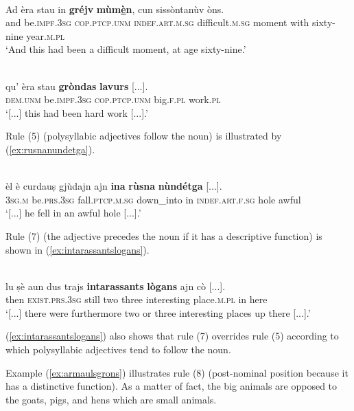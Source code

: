 \ea
\label{ex:grejvmumen}
\\
\gll    Ad èra stau in \textbf{gréjv} \textbf{mùm\underline{è}n}, cun sissòntanùv òns.\\
and be.\textsc{impf.3sg} \textsc{cop.ptcp.unm} \textsc{indef.art.m.sg} difficult.\textsc{m.sg} moment with sixty-nine year.\textsc{m.pl} \\
\glt `And this had been a difficult moment, at age sixty-nine.'
\z 

\ea
\label{ex:grondaslavurs}
\\
\gll [...] qu’ èra stau \textbf{gròndas} \textbf{lavurs} [...].\\
{} \textsc{dem.unm} be.\textsc{impf.3sg} \textsc{cop.ptcp.unm} big.\textsc{f.pl} work.\textsc{pl}\\
\glt `[...] this had been hard work [...].'
\z

Rule (5) (polysyllabic adjectives follow the noun) is illustrated by (\ref{ex:rusnanundetga}).

\ea
\label{ex:rusnanundetga}
\\
\gll  [...] èl è curdauṣ gjùdajn ajn \textbf{ina} \textbf{rùsna} \textbf{nùndétga} [...].  \\
{} \textsc{3sg.m} be.\textsc{prs.3sg} fall.\textsc{ptcp.m.sg} down\_into in \textsc{indef.art.f.sg} hole awful\\
\glt `[...] he fell in an awful hole [...].'
\z

Rule (7) (the adjective precedes the noun if it has a descriptive function) is shown in (\ref{ex:intarassantslogans}).

\ea
\label{ex:intarassantslogans}
\\
\gll [...] lu ṣè aun dus trajs \textbf{intarassants} \textbf{lògans} ajn cò [...].\\
 {} then \textsc{exist.prs.3sg} still two three interesting place.\textsc{m.pl} in here\\
\glt `[...] there were furthermore two or three interesting places up there [...].'
\z

(\ref{ex:intarassantslogans}) also shows that rule (7) overrides rule (5) according to which polysyllabic adjectives tend to follow the noun.

Example (\ref{ex:armaulsgrons}) illustrates rule (8) (post-nominal position because it has a distinctive function). As a matter of fact, the big animals are opposed to the goats, pigs, and hens which are small animals.

